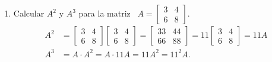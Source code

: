 \begin{enumerate}[topsep=6pt,itemsep=.4cm]
\begin{equation*}
\end{equation*}
\begin{equation*}
    AB=\begin{bmatrix} 2 & -1 & 1 \\ 1 & 2 &
    1\end{bmatrix}\begin{bmatrix} 3 \\ 1 \\ -1\end{bmatrix} = \begin{bmatrix} 4 \\ 4 \end{bmatrix}.
\end{equation*}
\begin{equation*}
    (AB)C= \begin{bmatrix} 4 \\ 4 \end{bmatrix}\begin{bmatrix} 1 & -1 \end{bmatrix} = \begin{bmatrix} 4&-4 \\ 4&-4 \end{bmatrix}.
\end{equation*}\qed


\item Calcular $A^2$ y $A^3$ para la matriz \
$
A=\begin{bmatrix}
3 & 4\\ 6 & 8
\end{bmatrix}.
$
\rta
\begin{align*}
    A^2 &= \begin{bmatrix}
        3 & 4\\ 6 & 8
        \end{bmatrix}\begin{bmatrix}
            3 & 4\\ 6 & 8
            \end{bmatrix} = \begin{bmatrix}
                33 & 44\\ 66 & 88
                \end{bmatrix}  = 11\begin{bmatrix}
                    3 & 4\\ 6 & 8
                    \end{bmatrix} = 11A\\
    A^3 &= A\cdot A^2 = A\cdot 11A = 11A^2 = 11^2A. 
\end{align*}


\end{enumerate}
